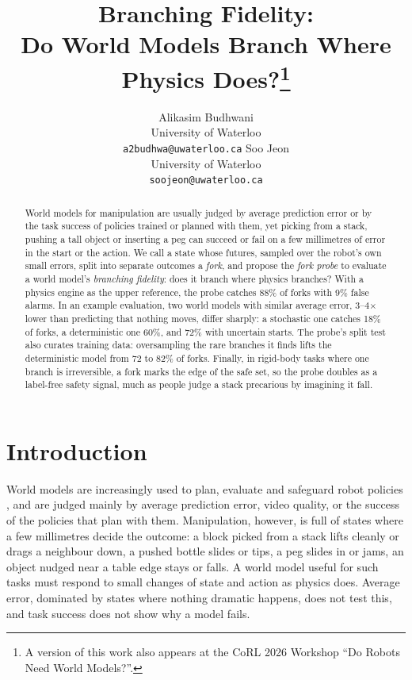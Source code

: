 \documentclass{article}
\title{Branching Fidelity:\\ Do World Models Branch Where Physics Does?\thanks{A version of this work also appears at the CoRL 2026 Workshop ``Do Robots Need World Models?''.}}
\author{
  Alikasim Budhwani\\
  University of Waterloo\\
  \texttt{a2budhwa@uwaterloo.ca}
  \And
  Soo Jeon\\
  University of Waterloo\\
  \texttt{soojeon@uwaterloo.ca}
}
\begin{document}
\maketitle

\begin{abstract}
World models for manipulation are usually judged by average prediction error or by the task success of
policies trained or planned with them, yet picking from a stack,
pushing a tall object or inserting a peg can succeed or fail on a few millimetres of error in the start or
the action. We call a state whose futures, sampled over the robot's own small errors, split into separate
outcomes a \emph{fork}, and propose the \emph{fork probe} to evaluate a world model's \emph{branching
fidelity}: does it branch where physics branches? With a physics engine as the upper reference, the probe
catches 88\% of forks with 9\% false alarms. In an example evaluation, two world models with similar average error, 3--4$\times$ lower than
predicting that nothing moves, differ sharply: a stochastic one catches 18\% of forks, a deterministic one
60\%, and 72\% with uncertain starts. The probe's split test also curates training data: oversampling the
rare branches it finds lifts the deterministic model from 72 to 82\% of forks. Finally, in rigid-body
tasks where one branch is irreversible, a fork marks the edge of the safe set, so the probe doubles as a
label-free safety signal, much as people judge a stack precarious by imagining it fall.
\end{abstract}


\section{Introduction}
World models are increasingly used to plan, evaluate and safeguard robot policies
\citep{zhou2025dinowm,assran2025vjepa2,hafner2025dreamerv3}, and are judged mainly by average prediction
error, video quality, or the success of the policies that plan with them. Manipulation, however, is full of states where a few millimetres decide the outcome: a block picked
from a stack lifts cleanly or drags a neighbour down, a pushed bottle slides or tips, a peg slides in or
jams, an object nudged near a table edge stays or falls. A world model useful for such tasks
must respond to small changes of state and action as physics does. Average error, dominated by states
where nothing dramatic happens, does not test this, and task success does not show why a model fails.
\end{document}
